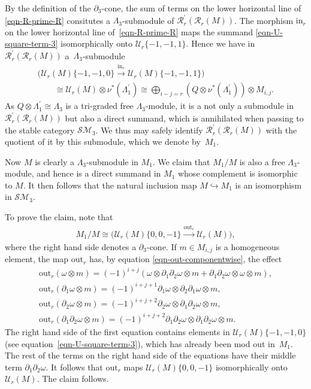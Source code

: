 \documentclass[pdftex]{sigma}
\theoremstyle{definition}
\numberwithin{equation}{section}
\def\dif{\partial}
\def\mc{\mathcal}
\begin{document}
By the definition of the $\dif_3$-cone, the sum of terms on the lower horizontal line of \eqref{eqn-R-prime-R} consitutes a $\Lambda_3$-submodule of $\mc{R}^\prime_r(\mc{R}_r(M))$. The morphism $\mathrm{in}_r$ on the lower horizontal line of~\eqref{eqn-R-prime-R} maps the summand \eqref{eqn-U-square-term-3} isomorphically onto $\mc{U}_r\{-1,-1,1\}$. Hence we have in~$\mc{R}^\prime_r(\mc{R}_r(M))$ a~$\Lambda_3$-submodule
\begin{gather}
\big(\mc{U}_r(M)\{-1,-1,0\}\xrightarrow{\mathrm{in}_r} \mc{U}_r(M)\{-1,-1,1\}\big)\nonumber\\
\qquad{} \cong \mc{U}_r(M)\otimes \nu^*(\Lambda_1^\prime) \cong \bigoplus_{i-j=r} (Q\otimes \nu^*(\Lambda_1^\prime)) \otimes M_{i,j}.\label{eqn-d3-cone-of-iso-proj}
\end{gather}
As $Q\otimes \Lambda_1^\prime \cong \Lambda_3$ is a tri-graded free $\Lambda_3$-module, it is a not only a submodule in $\mc{R}^\prime_r(\mc{R}_r(M))$ but also a direct summand, which is annihilated when passing to the stable category $\mc{SM}_3$. We thus may safely identify $ \mc{R}^\prime_r(\mc{R}_r(M))$ with the quotient of it by this submodule, which we denote by~$M_1$.

Now $M$ is clearly a $\Lambda_3$-submodule in $M_1$. We claim that $M_1/M$ is also a free $\Lambda_3$-module, and hence is a direct summand in $M_1$ whose complement is isomorphic to $M$.
It then follows that the natural inclusion map $M\hookrightarrow M_1$ is an isomorphism in $\mc{SM}_3$.

To prove the claim, note that
\begin{gather*}
 M_1/M\cong \big( \mc{U}_r(M)\{0,0,-1\}\xrightarrow{\mathrm{out}_r}\mc{U}_r(M) \big),
\end{gather*}
where the right hand side denotes a $\dif_3$-cone. If $m\in M_{i,j}$ is a homogeneous element, the map $\mathrm{out}_r$ has, by equation \eqref{eqn-out-componentwise}, the effect
\begin{gather*}
\mathrm{out}_r(\omega\otimes m) =(-1)^{i+j}\left(\omega\otimes \dif_1\dif_2\omega \otimes m + \dif_1\dif_2\omega\otimes \omega\otimes m\right), \\
\mathrm{out}_r(\dif_1 \omega\otimes m) = (-1)^{i+j+1} \dif_1\omega \otimes \dif_2\dif_1\omega \otimes m,\\
\mathrm{out}_r(\dif_2\omega\otimes m) = (-1)^{i+j+2} \dif_2\omega \otimes \dif_1\dif_2\omega \otimes m,\\
\mathrm{out}_r(\dif_1\dif_2\omega\otimes m) = (-1)^{i+j+2}\dif_1\dif_2\omega\otimes \dif_1\dif_2\omega \otimes m.
\end{gather*}
The right hand side of the first equation contains elements in $\mc{U}_r(M)\{-1,-1,0\}$ (see equation~\eqref{eqn-U-square-term-3}), which has already been mod out in~$M_1$. The rest of the terms on the right hand side of the equations have their middle term $\dif_1\dif_2\omega$. It follows that $\mathrm{out}_r$ maps $\mc{U}_r(M)\{0,0,-1\}$ isomorphically onto~$\mc{U}_r(M)$. The claim follows.
\end{document}

